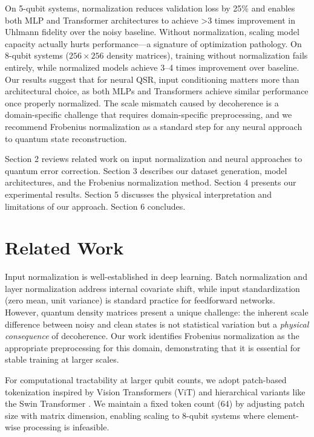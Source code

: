 \documentclass{ieeeqccl}
\begin{document}
On 5-qubit systems, normalization reduces validation loss by 25\% and enables both MLP and Transformer architectures to achieve >3 times improvement in Uhlmann fidelity over the noisy baseline. Without normalization, scaling model capacity actually hurts performance—a signature of optimization pathology. On 8-qubit systems (\(256 \times 256\) density matrices), training without normalization fails entirely, while normalized models achieve 3–4 times improvement over baseline. Our results suggest that for neural QSR, input conditioning matters more than architectural choice, as both MLPs and Transformers achieve similar performance once properly normalized. The scale mismatch caused by decoherence is a domain-specific challenge that requires domain-specific preprocessing, and we recommend Frobenius normalization as a standard step for any neural approach to quantum state reconstruction.

Section 2 reviews related work on input normalization and neural approaches to quantum error correction. Section 3 describes our dataset generation, model architectures, and the Frobenius normalization method. Section 4 presents our experimental results. Section 5 discusses the physical interpretation and limitations of our approach. Section 6 concludes.
\section{Related Work}
\label{sec:orgf1bdac1}
Input normalization is well-established in deep learning. Batch normalization \autocite{ioffe2015batch} and layer normalization \autocite{ba2016layer} address internal covariate shift, while input standardization (zero mean, unit variance) is standard practice for feedforward networks.  However, quantum density matrices present a unique challenge: the inherent scale difference between noisy and clean states is not statistical variation but a \emph{physical consequence} of decoherence.  Our work identifies Frobenius normalization as the appropriate preprocessing for this domain, demonstrating that it is essential for stable training at larger scales.

For computational tractability at larger qubit counts, we adopt patch-based tokenization inspired by Vision Transformers (ViT) \autocite{dosovitskiy2020image} and hierarchical variants like the Swin Transformer \autocite{liu2021swin}.  We maintain a fixed token count (64) by adjusting patch size with matrix dimension, enabling scaling to 8-qubit systems where element-wise processing is infeasible.
\end{document}
